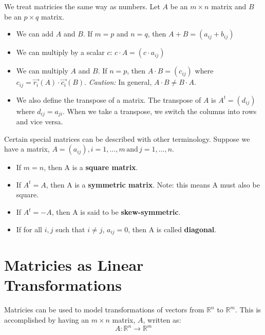 \documentclass[../main.tex]{subfiles}
\begin{document}
We treat matricies the same way as numbers.
Let \( A \) be an \( m \times n \) matrix and \( B \) be an \( p \times q \) matrix.
\begin{itemize}[mode=unboxed]
    \item We can add \( A \) and \( B \). If \( m=p \) and \( n=q \), then \( A+B = ( a_{ij}+b_{ij} ) \)
    \item We can multiply by a scalar \( c \): \( c \cdot A = ( c \cdot a_{ij} ) \)
    \item We can multiply \( A \) and \( B \). If \( n=p \), then \( A \cdot B = (c_{ij}) \) where \( c_{ij} = \vec{r_{i}}(A) \cdot \vec{c_{i}}(B) \).
        \emph{Caution:} In general, \( A \cdot B \neq B \cdot A \).
    \item We also define the transpose of a matrix. The transpose of \( A \) is \( A^t = (d_{ij}) \) where \( d_{ij} = a_{ji} \).
        When we take a transpose, we switch the columns into rows and vice versa.
\end{itemize}

Certain special matrices can be described with other terminology.
Suppose we have a matrix, \( A = (a_{ij}), i = 1, \dots ,m \, \text{and} \, j = 1, \dots ,n \).
\begin{itemize}
    \item If \( m=n \), then A is a \textbf{square matrix}.
    \item If \( A^t = A \), then A is a \textbf{symmetric matrix}. Note: this means A must also be square.
    \item If \( A^t = -A \), then A is said to be \textbf{skew-symmetric}.
    \item If for all \( i,j \) such that \( i \neq j \), \( a_{ij} = 0 \), then A is called \textbf{diagonal}.
\end{itemize}


\section{Matricies as Linear Transformations}

Matricies can be used to model transformations of vectors from \( \mathbb{R}^n \) to \( \mathbb{R}^m \).
This is accomplished by having an \( m \times n \) matrix, \( A \), written as: \[ A: \mathbb{R}^n \rightarrow \mathbb{R}^m \]
\end{document}
